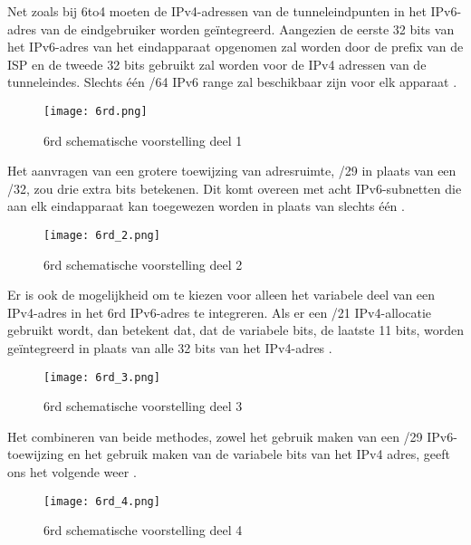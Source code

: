 Net zoals bij 6to4 moeten de IPv4-adressen van de tunneleindpunten in het IPv6-adres van de eindgebruiker worden geïntegreerd. Aangezien de eerste 32 bits van het IPv6-adres van het eindapparaat opgenomen zal worden door de prefix van de ISP en de tweede 32 bits gebruikt zal worden voor de IPv4 adressen van de tunneleindes. Slechts één /64 IPv6 range zal beschikbaar zijn voor elk apparaat \autocite{RIPE2016}.

\begin{figure}
\texttt{[image: 6rd.png]}
\centering
\caption{6rd schematische voorstelling deel 1 \autocite{RIPE2016}}
\centering
\end{figure}

Het aanvragen van een grotere toewijzing van adresruimte, /29 in plaats van een /32, zou drie extra bits betekenen. Dit komt overeen met acht IPv6-subnetten die aan elk eindapparaat kan toegewezen worden in plaats van slechts één \autocite{RIPE2016}. 

\begin{figure}
\texttt{[image: 6rd\_2.png]}
\centering
\caption{6rd schematische voorstelling deel 2 \autocite{RIPE2016}}
\centering
\end{figure}

Er is ook de mogelijkheid om te kiezen voor alleen het variabele deel van een IPv4-adres in het 6rd IPv6-adres te integreren. Als er een /21 IPv4-allocatie gebruikt wordt, dan betekent dat, dat de variabele bits, de laatste 11 bits, worden geïntegreerd in plaats van alle 32 bits van het IPv4-adres \autocite{RIPE2016}.

\begin{figure}
\texttt{[image: 6rd\_3.png]}
\centering
\caption{6rd schematische voorstelling deel 3 \autocite{RIPE2016}}
\centering
\end{figure}

Het combineren van beide methodes, zowel het gebruik maken van een /29 IPv6-toewijzing en het gebruik maken van de variabele bits van het IPv4 adres, geeft ons het volgende weer \autocite{RIPE2016}.

\begin{figure}
\texttt{[image: 6rd\_4.png]}
\centering
\caption{6rd schematische voorstelling deel 4 \autocite{RIPE2016}}
\centering
\end{figure}

